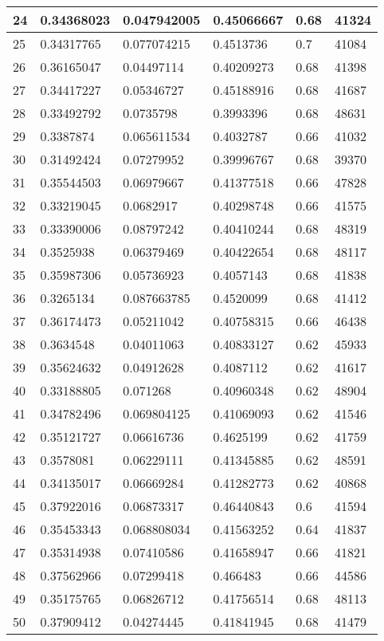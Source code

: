 \begin{longtable}{|l|l|l|l|l|l|}
24 & 0.34368023 & 0.047942005 & 0.45066667 & 0.68 & 41324 \\ \hline 
25 & 0.34317765 & 0.077074215 & 0.4513736 & 0.7 & 41084 \\ \hline 
26 & 0.36165047 & 0.04497114 & 0.40209273 & 0.68 & 41398 \\ \hline 
27 & 0.34417227 & 0.05346727 & 0.45188916 & 0.68 & 41687 \\ \hline 
28 & 0.33492792 & 0.0735798 & 0.3993396 & 0.68 & 48631 \\ \hline 
29 & 0.3387874 & 0.065611534 & 0.4032787 & 0.66 & 41032 \\ \hline 
30 & 0.31492424 & 0.07279952 & 0.39996767 & 0.68 & 39370 \\ \hline 
31 & 0.35544503 & 0.06979667 & 0.41377518 & 0.66 & 47828 \\ \hline 
32 & 0.33219045 & 0.0682917 & 0.40298748 & 0.66 & 41575 \\ \hline 
33 & 0.33390006 & 0.08797242 & 0.40410244 & 0.68 & 48319 \\ \hline 
34 & 0.3525938 & 0.06379469 & 0.40422654 & 0.68 & 48117 \\ \hline 
35 & 0.35987306 & 0.05736923 & 0.4057143 & 0.68 & 41838 \\ \hline 
36 & 0.3265134 & 0.087663785 & 0.4520099 & 0.68 & 41412 \\ \hline 
37 & 0.36174473 & 0.05211042 & 0.40758315 & 0.66 & 46438 \\ \hline 
38 & 0.3634548 & 0.04011063 & 0.40833127 & 0.62 & 45933 \\ \hline 
39 & 0.35624632 & 0.04912628 & 0.4087112 & 0.62 & 41617 \\ \hline 
40 & 0.33188805 & 0.071268 & 0.40960348 & 0.62 & 48904 \\ \hline 
41 & 0.34782496 & 0.069804125 & 0.41069093 & 0.62 & 41546 \\ \hline 
42 & 0.35121727 & 0.06616736 & 0.4625199 & 0.62 & 41759 \\ \hline 
43 & 0.3578081 & 0.06229111 & 0.41345885 & 0.62 & 48591 \\ \hline 
44 & 0.34135017 & 0.06669284 & 0.41282773 & 0.62 & 40868 \\ \hline 
45 & 0.37922016 & 0.06873317 & 0.46440843 & 0.6 & 41594 \\ \hline 
46 & 0.35453343 & 0.068808034 & 0.41563252 & 0.64 & 41837 \\ \hline 
47 & 0.35314938 & 0.07410586 & 0.41658947 & 0.66 & 41821 \\ \hline 
48 & 0.37562966 & 0.07299418 & 0.466483 & 0.66 & 44586 \\ \hline 
49 & 0.35175765 & 0.06826712 & 0.41756514 & 0.68 & 48113 \\ \hline 
50 & 0.37909412 & 0.04274445 & 0.41841945 & 0.68 & 41479 \\ \hline 
\end{longtable}